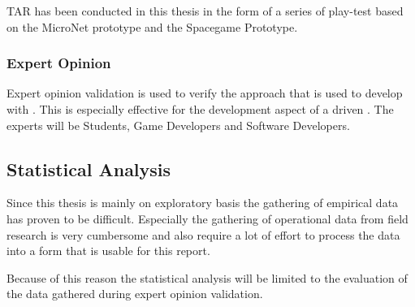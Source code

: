 TAR has been conducted in this thesis in the form of a series of play-test based
on the MicroNet prototype and the Spacegame Prototype.

\subsubsection{Expert Opinion}

Expert opinion validation is used to verify the approach that is used to
develop \ogs{} with \mss{}. This is especially effective for the development
aspect of a \ms{} driven \og{}. The experts will be Students, Game Developers
and Software Developers.

\subsection{Statistical Analysis}

Since this thesis is mainly on exploratory basis the gathering of empirical data
has proven to be difficult. Especially the gathering of operational data from
field research is very cumbersome and also require a lot of effort to process
the data into a form that is usable for this report.

Because of this reason the statistical analysis will be limited to the
evaluation of the data gathered during expert opinion validation. 






